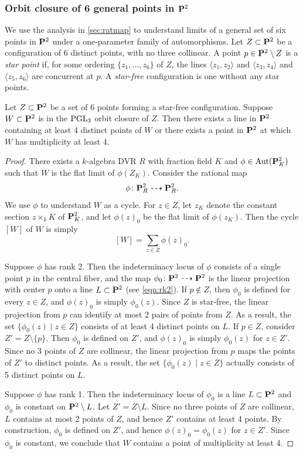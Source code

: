\documentclass[12pt,reqno]{amsart}
\renewcommand{\k}{k}
\numberwithin{equation}{section}
\begin{document}
\subsubsection{Orbit closure of 6 general points in $\P^2$}\label{sec:orb6}
We use the analysis in \autoref{sec:ratmap} to understand limits of a general set of six points in $\P^2$ under a one-parameter family of automorphisms.
Let $Z \subset \P^2$ be a configuration of 6 distinct points, with no three collinear.
A point $p \in \P^2 \setminus Z$ is a \emph{star point} if, for some ordering $\{z_1, \dots, z_6\}$ of $Z$, the lines $\langle z_1, z_2 \rangle$ and $\langle  z_3, z_4 \rangle$ and $\langle  z_5, z_6 \rangle$ are concurrent at $p$.
A \emph{star-free} configuration is one without any star points.

\begin{proposition}\label{prop:limit4}
  Let $Z \subset \P^2$ be a set of 6 points forming a star-free configuration.
  Suppose $W \subset \P^2$ is in the $\PGL_3$ orbit closure of $Z$.
  Then there exists a line in $\P^2$ containing at least 4 distinct points of $W$ or there exists a point in $\P^2$ at which $W$ has multiplicity at least 4.
\end{proposition}
\begin{proof}
  There exists a $\k$-algebra DVR $R$ with fraction field $K$ and $\phi \in \Aut(\P^2_K)$ such that $W$ is the flat limit of $\phi(Z_K)$.
  Consider the rational map
  \[ \phi \colon \P^2_R \dashrightarrow \P^2_R.\]
  We use $\phi$ to understand $W$ as a cycle.
  For $z \in Z$, let $z_K$ denote the constant section $z \times_k K$ of $\P^2_K$, and let $\phi(z)_0$ be the flat limit of $\phi(z_K)$.
  Then the cycle $[W]$ of $W$ is simply
  \[ [W] = \sum_{z \in Z} \phi(z)_0.\]

  Suppose $\phi$ has rank 2.
  Then the indeterminacy locus of $\phi$ consists of a single point $p$ in the central fiber, and the map $\phi_0 \colon \P^2 \dashrightarrow \P^2$
  is the linear projection with center $p$ onto a line $L \subset \P^2$ (see \eqref{eqn:rk2}).
  If $p \not \in Z$, then  $\phi_0$ is defined for every $z \in Z$, and $\phi(z)_0$ is simply $\phi_0(z)$.
  Since $Z$ is star-free, the linear projection from $p$ can identify at most 2 pairs of points from $Z$.
  As a result, the set $\{\phi_0(z) \mid z \in Z\}$ consists of at least 4 distinct points on $L$.
  If $p \in Z$, consider $Z' = Z \setminus \{p\}$.
  Then $\phi_0$ is defined on $Z'$, and $\phi(z)_0$ is simply $\phi_0(z)$ for $z \in Z'$.
  Since no 3 points of $Z$ are collinear, the linear projection from $p$ maps the points of $Z'$ to distinct points.
  As a result, the set $\{\phi_0(z) \mid z \in Z\}$ actually consists of 5 distinct points on $L$.

  Suppose $\phi$ has rank 1.
  Then the indeterminacy locus of $\phi_0$ is a line $L \subset \P^2$ and $\phi_0$ is constant on $\P^2 \setminus L$.
  Let $Z' = Z \setminus L$.
  Since no three points of $Z$ are collinear, $L$ contains at most 2 points of $Z$, and hence $Z'$ contains at least 4 points.
  By construction, $\phi_0$ is defined on $Z'$, and hence $\phi(z)_0 = \phi_0(z)$ for $z \in Z'$.
  Since $\phi_0$ is constant, we conclude that $W$ contains a point of multiplicity at least 4.
\end{proof}
\end{document}
